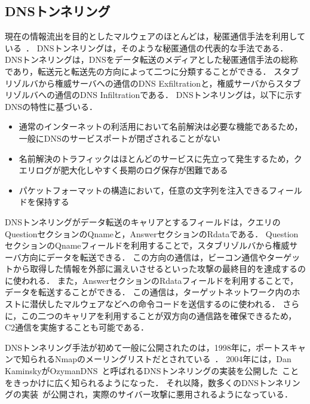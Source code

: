 \subsection{DNSトンネリング}
\label{sec:dns-tunneling}
現在の情報流出を目的としたマルウェアのほとんどは，秘匿通信手法を利用している~\cite{asaf}．
DNSトンネリングは，そのような秘匿通信の代表的な手法である．
DNSトンネリングは，DNSをデータ転送のメディアとした秘匿通信手法の総称であり，転送元と転送先の方向によって二つに分類することができる．
スタブリゾルバから権威サーバへの通信のDNS Exfiltrationと，権威サーバからスタブリゾルバへの通信のDNS Infiltrationである．
DNSトンネリングは，以下に示すDNSの特性に基づいる．

\begin{itemize}
 \setlength{\itemsep}{0pt}
 \item 通常のインターネットの利活用において名前解決は必要な機能であるため，一般にDNSのサービスポートが閉ざされることがない
 \item 名前解決のトラフィックはほとんどのサービスに先立って発生するため，クエリログが肥大化しやすく長期のログ保存が困難である
 \item パケットフォーマットの構造において，任意の文字列を注入できるフィールドを保持する
\end{itemize}

DNSトンネリングがデータ転送のキャリアとするフィールドは，クエリのQuestionセクションのQnameと，AnswerセクションのRdataである．
QuestionセクションのQnameフィールドを利用することで，スタブリゾルバから権威サーバ方向にデータを転送できる．
この方向の通信は，ビーコン通信やターゲットから取得した情報を外部に漏えいさせるといった攻撃の最終目的を達成するのに使われる．
また，AnswerセクションのRdataフィールドを利用することで，データを転送することができる．
この通信は，ターゲットネットワーク内のホストに潜伏したマルウェアなどへの命令コードを送信するのに使われる．
さらに，この二つのキャリアを利用することが双方向の通信路を確保できるため，C2通信を実施することも可能である．

DNSトンネリング手法が初めて一般に公開されたのは，1998年に，ポートスキャンで知られるNmapのメーリングリストだとされている~\cite{nmap, maarten}．
2004年には，Dan KaminskyがOzymanDNS~\cite{ozymandns}と呼ばれるDNSトンネリングの実装を公開した~\cite{dan-kaminsky}ことをきっかけに広く知られるようになった．
それ以降，数多くのDNSトンネリングの実装~\cite{heyoka, iodine, dnscat2, tcp-over-dns, dnscat, denise, dns-shell, dnsbotnet, dnscapy, dohtunnel, godoh, dohc2, magictunnelandroid, dns2tcp, tuns}が公開され，実際のサイバー攻撃に悪用されるようになっている．

